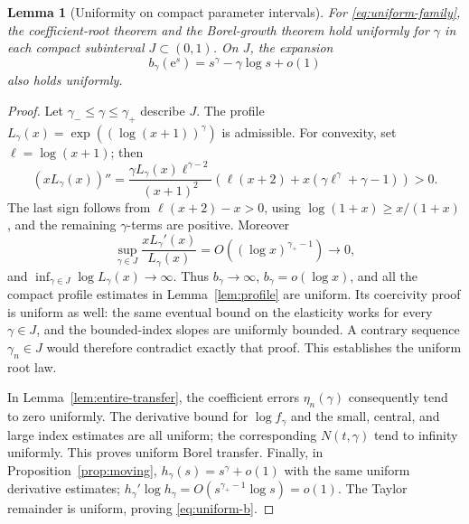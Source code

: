 \documentclass[11pt,a4paper]{article}
\numberwithin{equation}{section}
\newtheorem{lemma}[theorem]{Lemma}
\theoremstyle{definition}
\theoremstyle{remark}
\newcommand{\ee}{\mathrm e}
\begin{document}
\begin{lemma}[Uniformity on compact parameter intervals]
\label{lem:gamma-uniform}
For \eqref{eq:uniform-family}, the coefficient-root theorem and the
Borel-growth theorem hold uniformly for $\gamma$ in each compact
subinterval $J\subset(0,1)$. On $J$, the expansion
\begin{equation}
 b_\gamma(\ee^s)=s^\gamma-\gamma\log s+o(1)
 \label{eq:uniform-b}
\end{equation}
also holds uniformly.
\end{lemma}
\begin{proof}
Let $\gamma_-\le\gamma\le\gamma_+$ describe $J$.
The profile $L_\gamma(x)=\exp((\log(x+1))^\gamma)$ is admissible.
For convexity, set $\ell=\log(x+1)$; then
\[
 (xL_\gamma(x))''=
 \frac{\gamma L_\gamma(x)\ell^{\gamma-2}}{(x+1)^2}
 \left(\ell(x+2)+x(\gamma\ell^\gamma+\gamma-1)\right)>0.
\]
The last sign follows from
$\ell(x+2)-x>0$, using $\log(1+x)\ge x/(1+x)$, and the remaining
$\gamma$-terms are positive. Moreover
\[
 \sup_{\gamma\in J}\frac{xL_\gamma'(x)}{L_\gamma(x)}
 =O((\log x)^{\gamma_+-1})\longrightarrow0,
\]
and $\inf_{\gamma\in J}\log L_\gamma(x)\to\infty$.
Thus $b_\gamma\to\infty$, $b_\gamma=o(\log x)$, and all the compact
profile estimates in Lemma~\ref{lem:profile} are uniform. Its coercivity
proof is uniform as well: the same eventual bound on the elasticity
works for every $\gamma\in J$, and the bounded-index slopes are uniformly
bounded. A contrary sequence $\gamma_n\in J$ would therefore contradict
exactly that proof. This establishes the uniform root law.

In Lemma~\ref{lem:entire-transfer}, the coefficient errors
$\eta_n(\gamma)$ consequently tend to zero uniformly. The derivative
bound for $\log f_\gamma$ and the small, central, and large index
estimates are all uniform; the corresponding $N(t,\gamma)$ tend to
infinity uniformly. This proves uniform Borel transfer.
Finally, in Proposition~\ref{prop:moving},
$h_\gamma(s)=s^\gamma+o(1)$ with the same uniform derivative estimates;
$h_\gamma'\log h_\gamma=O(s^{\gamma_+-1}\log s)=o(1)$.
The Taylor remainder is uniform, proving \eqref{eq:uniform-b}.
\end{proof}
\end{document}
